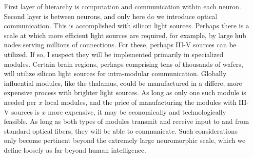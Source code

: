 \documentclass[twocolumn]{article}
\begin{document}
\vspace{3em}
First layer of hierarchy is computation and communication within each neuron. Second layer is between neurons, and only here do we introduce optical communication. This is accomplished with silicon light sources. Perhaps there is a scale at which more efficient light sources are required, for example, by large hub nodes serving millions of connections. For these, perhaps III-V sources can be utilized. If so, I suspect they will be implemented primarily in specialized modules. Certain brain regions, perhaps comprising tens of thousands of wafers, will utilize silicon light sources for intra-modular communication. Globally influential modules, like the thalamus, could be manufactured in a differe, more expensive process with brighter light sources. As long as only one such module is needed per $x$ local modules, and the price of manufacturing the modules with III-V sources is $x$ more expensive, it may be economically and technologically feasible. As long as both types of modules transmit and receive input to and from standard optical fibers, they will be able to communicate. Such considerations only become pertinent beyond the extremely large neuromorphic scale, which we define loosely as far beyond human intelligence. 
 




\end{document}
